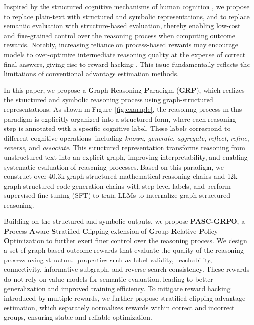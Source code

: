 Inspired by the structured cognitive mechanisms of human cognition \cite{George2021ClonestructuredGR}, we propose to replace plain-text with structured and symbolic representations, and to replace semantic evaluation with structure-based evaluation, thereby enabling low-cost and fine-grained control over the reasoning process when computing outcome rewards.
Notably, increasing reliance on process-based rewards may encourage models to over-optimize intermediate reasoning quality at the expense of correct final answers, giving rise to reward hacking \cite{Denison2024SycophancyTS}. This issue fundamentally reflects the limitations of conventional advantage estimation methods.

In this paper, we propose a \textbf{G}raph \textbf{R}easoning \textbf{P}aradigm (\textbf{GRP}), which realizes the structured and symbolic reasoning process using graph-structured representations.
As shown in Figure~\ref{fig:example}, the reasoning process in this paradigm is explicitly organized into a structured form, where each reasoning step is annotated with a specific cognitive label.
These labels correspond to different cognitive operations, including \emph{known}, \emph{generate}, \emph{aggregate}, \emph{reflect}, \emph{refine}, \emph{reverse}, and \emph{associate}. 
This structured representation transforms reasoning from unstructured text into an explicit graph, improving interpretability, and enabling systematic evaluation of reasoning processes. 
Based on this paradigm, we construct over 40.3k graph-structured mathematical reasoning chains and 12k graph-structured code generation chains with step-level labels, and perform supervised fine-tuning (SFT) to train LLMs to internalize graph-structured reasoning.

Building on the structured and symbolic outputs, we propose \textbf{PASC-GRPO}, a \textbf{P}rocess-\textbf{A}ware \textbf{S}tratified \textbf{C}lipping extension of \textbf{G}roup \textbf{R}elative \textbf{P}olicy \textbf{O}ptimization to further exert finer control over the reasoning process. 
We design a set of graph-based outcome rewards that evaluate the quality of the reasoning process using structural properties such as label validity, reachability, connectivity, informative subgraph, and reverse search consistency. 
These rewards do not rely on value models for semantic evaluation, leading to better generalization and improved training efficiency. 
To mitigate reward hacking introduced by multiple rewards, we further propose stratified clipping advantage estimation, which separately normalizes rewards within correct and incorrect groups, ensuring stable and reliable optimization.


